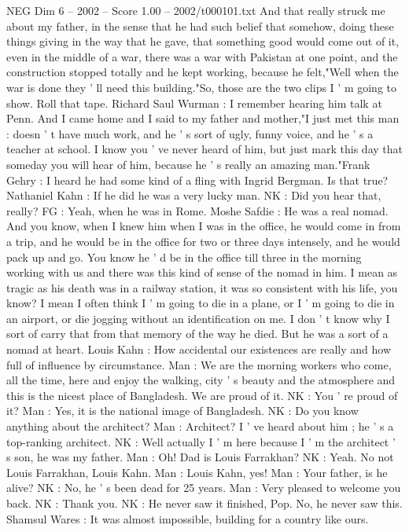 \begin{textsample}{NEG Dim 6 – 2002 – Score 1.00 – 2002/t000101.txt}
And that really struck me about my father, in the sense that he had such belief that somehow, doing these things giving in the way that he gave, that something good would come out of it, even in the middle of a war, there was a war with Pakistan at one point, and the construction stopped totally and he kept working, because he felt,"Well when the war is done they ' ll need this building."So, those are the two clips I ' m going to show.
Roll that tape.
Richard Saul Wurman : I remember hearing him talk at Penn.
And I came home and I said to my father and mother,"I just met this man : doesn ' t have much work, and he ' s sort of ugly, funny voice, and he ' s a teacher at school.
I know you ' ve never heard of him, but just mark this day that someday you will hear of him, because he ' s really an amazing man."Frank Gehry : I heard he had some kind of a fling with Ingrid Bergman.
Is that true?
Nathaniel Kahn : If he did he was a very lucky man.
NK : Did you hear that, really?
FG : Yeah, when he was in Rome.
Moshe Safdie : He was a real nomad.
And you know, when I knew him when I was in the office, he would come in from a trip, and he would be in the office for two or three days intensely, and he would pack up and go.
You know he ' d be in the office till three in the morning working with us and there was this kind of sense of the nomad in him.
I mean as tragic as his death was in a railway station, it was so consistent with his life, you know?
I mean I often think I ' m going to die in a plane, or I ' m going to die in an airport, or die jogging without an identification on me.
I don ' t know why I sort of carry that from that memory of the way he died.
But he was a sort of a nomad at heart.
Louis Kahn : How accidental our existences are really and how full of influence by circumstance.
Man : We are the morning workers who come, all the time, here and enjoy the walking, city ' s beauty and the atmosphere and this is the nicest place of Bangladesh.
We are proud of it.
NK : You ' re proud of it?
Man : Yes, it is the national image of Bangladesh.
NK : Do you know anything about the architect?
Man : Architect?
I ' ve heard about him ; he ' s a top-ranking architect.
NK : Well actually I ' m here because I ' m the architect ' s son, he was my father.
Man : Oh!
Dad is Louis Farrakhan?
NK : Yeah.
No not Louis Farrakhan, Louis Kahn.
Man : Louis Kahn, yes!
Man : Your father, is he alive?
NK : No, he ' s been dead for 25 years.
Man : Very pleased to welcome you back.
NK : Thank you.
NK : He never saw it finished, Pop.
No, he never saw this.
Shamsul Wares : It was almost impossible, building for a country like ours.

\end{textsample}
